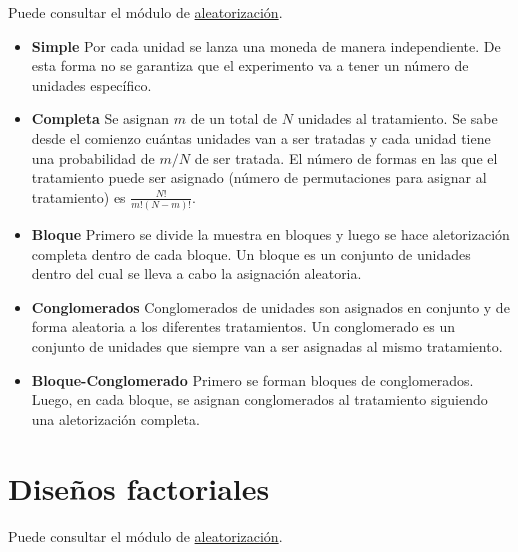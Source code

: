 \documentclass[12pt,spanish,]{book}
\providecommand{\tightlist}{%
  \setlength{\itemsep}{0pt}\setlength{\parskip}{0pt}}
\begin{document}
Puede consultar el módulo de \href{aleatorización.html}{aleatorización}.

\begin{itemize}
\tightlist
\item
  \textbf{Simple} Por cada unidad se lanza una moneda de manera independiente. De esta forma no se garantiza que el experimento va a tener un número de unidades específico.
\item
  \textbf{Completa} Se asignan \(m\) de un total de \(N\) unidades al tratamiento. Se sabe desde el comienzo cuántas unidades van a ser tratadas y cada unidad tiene una probabilidad de \(m/N\) de ser tratada. El número de formas en las que el tratamiento puede ser asignado
  (número de permutaciones para asignar al tratamiento) es \(\frac{N!}{m!(N-m)!}\).
\item
  \textbf{Bloque} Primero se divide la muestra en bloques y luego se hace aletorización completa dentro de cada bloque. Un bloque es un conjunto de unidades dentro del cual se lleva a cabo la asignación aleatoria.
\item
  \textbf{Conglomerados} Conglomerados de unidades son asignados en conjunto y de forma aleatoria a los diferentes tratamientos. Un conglomerado es un conjunto de unidades que siempre van a ser asignadas al mismo tratamiento.
\item
  \textbf{Bloque-Conglomerado} Primero se forman bloques de conglomerados. Luego, en cada bloque, se asignan conglomerados al tratamiento siguiendo una aletorización completa.
\end{itemize}

\hypertarget{diseuxf1os-factoriales}{%
\section{Diseños factoriales}\label{diseuxf1os-factoriales}}

Puede consultar el módulo de \href{aleatorización.html}{aleatorización}.
\end{document}
